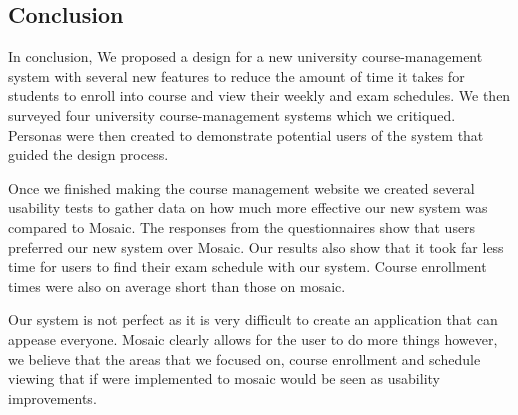 \documentclass[10pt]{article}
\begin{document}
\begin{multicols}{2}
\section*{Conclusion}
In conclusion, We proposed a design for a new university course-management system with several new features to reduce the amount of time it takes for students to enroll into course and view their weekly and exam schedules. We then surveyed four university course-management systems which we critiqued. Personas were then created to demonstrate potential users of the system that guided the design process. 

Once we finished making the course management website we created several usability tests to gather data on how much more effective our new system was compared to Mosaic. The responses from the questionnaires show that users preferred our new system over Mosaic. Our results also show that it took far less time for users to find their exam schedule with our system. Course enrollment times were also on average short than those on mosaic.

Our system is not perfect as it is very difficult to create an application that can appease everyone. Mosaic clearly allows for the user to do more things however, we believe that the areas that we focused on, course enrollment and schedule viewing that if were implemented to mosaic would be seen as usability improvements.

\end{multicols}
\end{document}
